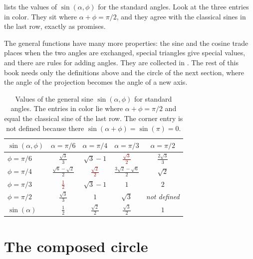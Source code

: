  lists the values of $\sin(\alpha, \phi)$ for the standard angles. Look at the three entries in color. They sit where $\alpha + \phi = \pi/2$, and they agree with the classical sines in the last row, exactly as  promises.

The general functions have many more properties: the sine and the cosine trade places when the two angles are exchanged, special triangles give special values, and there are rules for adding angles. They are collected in . The rest of this book needs only the definitions above and the circle of the next section, where the angle of the projection becomes the angle of a new axis.

\begin{table}[tb]
\myfloatalign
\renewcommand{\arraystretch}{1.35}
\begin{tabular}{l cccc}
\toprule
$\sin(\alpha, \phi)$ & $\alpha = \pi/6$ & $\alpha = \pi/4$ & $\alpha = \pi/3$ & $\alpha = \pi/2$ \\
\midrule
$\phi = \pi/6$ & $\frac{\sqrt{3}}{3}$ & $\sqrt{3} - 1$ & \textcolor{Maroon}{$\frac{\sqrt{3}}{2}$} & $\frac{2\sqrt{3}}{3}$ \\
$\phi = \pi/4$ & $\frac{\sqrt{6} - \sqrt{2}}{2}$ & \textcolor{Maroon}{$\frac{\sqrt{2}}{2}$} & $\frac{3\sqrt{2} - \sqrt{6}}{2}$ & $\sqrt{2}$ \\
$\phi = \pi/3$ & \textcolor{Maroon}{$\frac{1}{2}$} & $\sqrt{3} - 1$ & $1$ & $2$ \\
$\phi = \pi/2$ & $\frac{\sqrt{3}}{3}$ & $1$ & $\sqrt{3}$ & \emph{not defined} \\
\midrule
$\sin(\alpha)$ & $\frac{1}{2}$ & $\frac{\sqrt{2}}{2}$ & $\frac{\sqrt{3}}{2}$ & $1$ \\
\bottomrule
\end{tabular}
\caption[Values of the general sine]{Values of the general sine $\sin(\alpha, \phi)$ for standard angles. The entries in color lie where $\alpha + \phi = \pi/2$ and equal the classical sine of the last row. The corner entry is not defined because there $\sin(\alpha + \phi) = \sin(\pi) = 0$.}
\label{tab:general-sine}
\end{table}

\section{The composed circle}\label{sec:composed-circle}

